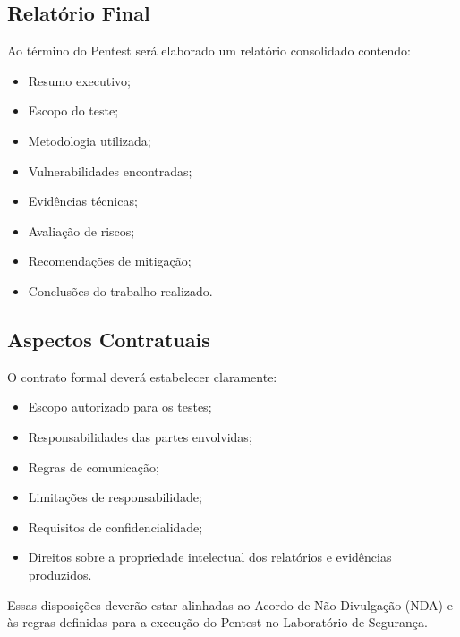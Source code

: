 \subsection{Relatório Final}

Ao término do Pentest será elaborado um relatório consolidado contendo:

\begin{itemize}
\item Resumo executivo;
\item Escopo do teste;
\item Metodologia utilizada;
\item Vulnerabilidades encontradas;
\item Evidências técnicas;
\item Avaliação de riscos;
\item Recomendações de mitigação;
\item Conclusões do trabalho realizado.
\end{itemize}

\subsection{Aspectos Contratuais}

O contrato formal deverá estabelecer claramente:

\begin{itemize}
\item Escopo autorizado para os testes;
\item Responsabilidades das partes envolvidas;
\item Regras de comunicação;
\item Limitações de responsabilidade;
\item Requisitos de confidencialidade;
\item Direitos sobre a propriedade intelectual dos relatórios e
evidências produzidos.
\end{itemize}

Essas disposições deverão estar alinhadas ao Acordo de Não Divulgação (NDA) e
às regras definidas para a execução do Pentest no Laboratório de Segurança.
